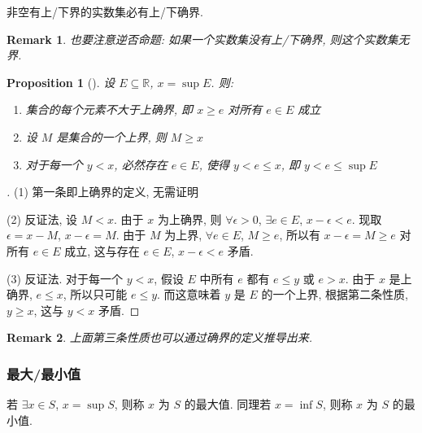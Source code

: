 \documentclass[UTF8]{ctexart}
\theoremstyle{mystyle}
\newtheorem{proposition}{Proposition}[section]
\theoremstyle{myremark}
\newtheorem*{remark}{Remark}
\theoremstyle{plain}
\newcommand{\R}{\mathbb R}
\begin{document}
\begin{theorem} 
    非空有上/下界的实数集必有上/下确界.
\end{theorem}

\begin{remark}
    也要注意逆否命题: 如果一个实数集没有上/下确界, 则这个实数集无界.
\end{remark}

\begin{proposition}[] \label{lup}
    设 $ E \subseteq \R $, $ x = \sup E $. 则:
    \begin{enumerate}
        \item 集合的每个元素不大于上确界, 即 $ x \geqslant e $ 对所有 $ e \in E $ 成立
        \item 设 $ M $ 是集合的一个上界, 则 $ M \geqslant x $
        \item 对于每一个 $ y < x $, 必然存在 $ e \in E $, 使得 $ y < e \leqslant x $, 即 $ y < e \leqslant \sup E $
    \end{enumerate}
\end{proposition}

\begin{proof}[]
    (1) 第一条即上确界的定义, 无需证明

    (2) 反证法, 设 $ M < x $. 由于 $ x $ 为上确界, 则 $ \forall \epsilon > 0 $, $ \exists e \in E $, $ x - \epsilon < e $. 现取 $ \epsilon = x - M $, $ x - \epsilon = M $. 由于 $ M $ 为上界, $ \forall e \in E $, $ M \geqslant e $, 所以有 $ x - \epsilon = M \geqslant e $ 对所有 $ e \in E $ 成立, 这与存在 $ e \in E $, $ x - \epsilon < e $ 矛盾.

    (3) 反证法. 对于每一个 $ y < x $, 假设 $ E $ 中所有 $ e $ 都有 $ e \leqslant y $ 或 $ e > x $. 由于 $ x $ 是上确界, $ e \leqslant x $, 所以只可能 $ e \leqslant y $. 而这意味着 $ y $ 是 $ E $ 的一个上界, 根据第二条性质, $ y \geqslant x $, 这与 $ y < x $ 矛盾.
\end{proof}

\begin{remark}
    上面第三条性质也可以通过确界的定义推导出来.
\end{remark}

\subsubsection{最大/最小值}
\begin{definition}
    若 $ \exists x \in S $, $ x = \sup S $, 则称 $ x $ 为 $ S $ 的最大值. 同理若 $ x = \inf S $, 则称 $ x $ 为 $ S $ 的最小值.
\end{definition}
\end{document}
